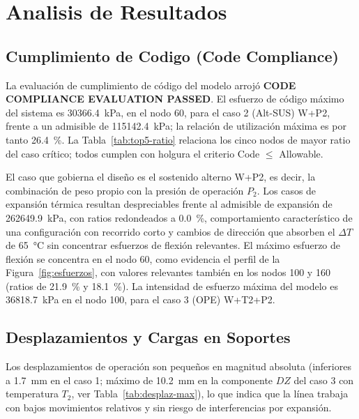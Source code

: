 \section{Analisis de Resultados}
\label{sec:analisis}

\subsection{Cumplimiento de Codigo (Code Compliance)}

La evaluaci\'{o}n de cumplimiento de c\'{o}digo del modelo arroj\'{o}
\textbf{CODE COMPLIANCE EVALUATION PASSED}. El esfuerzo de c\'{o}digo
m\'{a}ximo del sistema es \num{30366.4}~\si{kPa}, en el nodo 60, para el caso
2 (Alt-SUS) W+P2, frente a un admisible de \num{115142.4}~\si{kPa}; la
relaci\'{o}n de utilizaci\'{o}n m\'{a}xima es por tanto 26.4~\%. La
Tabla~\ref{tab:top5-ratio} relaciona los cinco nodos de mayor ratio del caso
cr\'{i}tico; todos cumplen con holgura el criterio Code $\leq$ Allowable.



El caso que gobierna el dise\~{n}o es el sostenido alterno W+P2, es decir, la
combinaci\'{o}n de peso propio con la presi\'{o}n de operaci\'{o}n $P_2$. Los
casos de expansi\'{o}n t\'{e}rmica resultan despreciables frente al admisible
de expansi\'{o}n de \num{262649.9}~\si{kPa}, con ratios redondeados a
0.0~\%, comportamiento caracter\'{i}stico de una configuraci\'{o}n con
recorrido corto y cambios de direcci\'{o}n que absorben el $\Delta T$ de
65~\si{\celsius} sin concentrar esfuerzos de flexi\'{o}n relevantes. El
m\'{a}ximo esfuerzo de flexi\'{o}n se concentra en el nodo 60, como evidencia
el perfil de la Figura~\ref{fig:esfuerzos}, con valores relevantes tambi\'{e}n
en los nodos 100 y 160 (ratios de 21.9~\% y 18.1~\%). La intensidad de
esfuerzo m\'{a}xima del modelo es \num{36818.7}~\si{kPa} en el nodo 100, para
el caso 3 (OPE) W+T2+P2.

\subsection{Desplazamientos y Cargas en Soportes}

Los desplazamientos de operaci\'{o}n son peque\~{n}os en magnitud absoluta
(inferiores a 1.7~\si{mm} en el caso 1; m\'{a}ximo de 10.2~\si{mm} en la
componente $DZ$ del caso 3 con temperatura $T_2$, ver
Tabla~\ref{tab:desplaz-max}), lo que indica que la l\'{i}nea trabaja con bajos
movimientos relativos y sin riesgo de interferencias por expansi\'{o}n.


